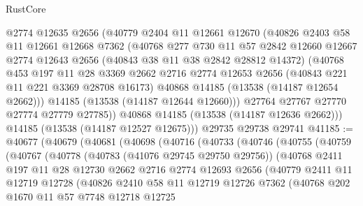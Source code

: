 \begin{lexlean}{RustCore}
\begin{coremodule}
        @2774
        @12635
        @2656
        (@40779
          @2404
          @11
          @12661
          @12670
          (@40826
            @2403
            @58
            @11
            @12661
            @12668
            @7362
            (@40768
              @277
              @730
              @11
              @57
              @2842
              @12660
              @12667
              @2774
              @12643
              @2656
              (@40843 @38 @11 @38 @2842 @28812 @14372)
              (@40768
                @453
                @197
                @11
                @28
                @3369
                @2662
                @2716
                @2774
                @12653
                @2656
                (@40843 @221 @11 @221 @3369 @28708 @16173)
                @40868
                @14185
                (@13538 (@14187 @12654 @2662)))
              @14185
              (@13538 (@14187 @12644 @12660)))
            @27764
            @27767
            @27770
            @27774
            @27779
            @27785))
        @40868
        @14185
        (@13538 (@14187 @12636 @2662)))
      @14185
      (@13538 (@14187 @12527 @12675)))
    @29735
    @29738
    @29741
@41185 := @40677
    (@40679
      (@40681
        (@40698
          (@40716
            (@40733
              (@40746
                (@40755
                  (@40759
                    (@40767
                      (@40778
                        (@40783 (@41076 @29745 @29750 @29756))
                        (@40768
                          @2411
                          @197
                          @11
                          @28
                          @12730
                          @2662
                          @2716
                          @2774
                          @12693
                          @2656
                          (@40779
                            @2411
                            @11
                            @12719
                            @12728
                            (@40826
                              @2410
                              @58
                              @11
                              @12719
                              @12726
                              @7362
                              (@40768
                                @202
                                @1670
                                @11
                                @57
                                @7748
                                @12718
                                @12725

\end{coremodule}
\end{lexlean}
